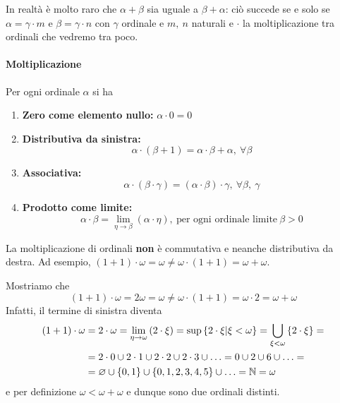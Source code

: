 In realtà è molto raro che $\alpha+\beta$ sia uguale a $\beta+\alpha$: ciò succede se e solo se $\alpha=\gamma \cdot m$ e $\beta=\gamma \cdot n$ con $\gamma$ ordinale e $m,\ n$ naturali e $\cdot$ la moltiplicazione tra ordinali che vedremo tra poco.
\paragraph{Moltiplicazione}
\begin{define}
	Per ogni ordinale $\alpha$ si ha
	\begin{enumerate}
		\item \textbf{Zero come elemento nullo:}
		$\alpha\cdot0=0$
		\item \textbf{Distributiva da sinistra:}
		\begin{equation*}
			\alpha\cdot\left(\beta+1\right)=\alpha\cdot\beta+\alpha,\ \forall \beta
		\end{equation*}
		\item \textbf{Associativa:}
		\begin{equation*}
			\alpha\cdot\left(\beta\cdot\gamma\right)=\left(\alpha\cdot\beta\right)\cdot\gamma,\ \forall \beta,\ \gamma
		\end{equation*}
		\item \textbf{Prodotto come limite:}
		\begin{equation*}
			\alpha\cdot\beta=\lim_{\eta\to\beta}\left(\alpha\cdot\eta\right),\ \text{per ogni ordinale limite}\ \beta>0
		\end{equation*}
	\end{enumerate}
\end{define}
\begin{attention}
	La moltiplicazione di ordinali \textbf{non} è commutativa e neanche distributiva da destra. Ad esempio, $\left(1+1\right)\cdot\omega=\omega\neq\omega\cdot\left(1+1\right)=\omega+\omega$.
\end{attention}
\begin{examplewt}
	Mostriamo che
	\begin{equation*}
		\left(1+1\right)\cdot\omega=2\omega=\omega\neq\omega\cdot\left(1+1\right)=\omega\cdot 2=\omega+\omega
	\end{equation*}
	Infatti, il termine di sinistra diventa
	\begin{align*}
		\left(1+1\right)\cdot\omega&=2\cdot\omega=\lim_{\eta\to \omega}\left(2\cdot\xi\right)=\sup\left\{2\cdot\xi\middle|\xi<\omega\right\}=\bigcup_{\xi<\omega}\left\{2\cdot\xi\right\}=\\
		&=2\cdot 0\cup2\cdot 1\cup 2\cdot2\cup 2\cdot3\cup \ldots=0\cup 2\cup 6\cup\ldots=\\
		&=\varnothing\cup\{0,1\}\cup\{0,1,2,3,4,5\}\cup\ldots=\mathbb{N}=\omega
	\end{align*}
	e per definizione $\omega<\omega+\omega$ e dunque sono due ordinali distinti.
\end{examplewt}
